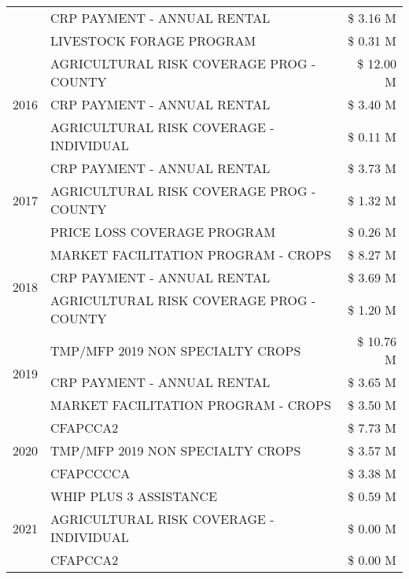 \begin{tabular}{llr}
 & CRP PAYMENT - ANNUAL RENTAL & \$ 3.16 M \\
 & LIVESTOCK FORAGE PROGRAM & \$ 0.31 M \\
\cline{1-3}
\multirow[t]{3}{*}{2016} & AGRICULTURAL RISK COVERAGE PROG - COUNTY & \$ 12.00 M \\
 & CRP PAYMENT - ANNUAL RENTAL & \$ 3.40 M \\
 & AGRICULTURAL RISK COVERAGE - INDIVIDUAL & \$ 0.11 M \\
\cline{1-3}
\multirow[t]{3}{*}{2017} & CRP PAYMENT - ANNUAL RENTAL & \$ 3.73 M \\
 & AGRICULTURAL RISK COVERAGE PROG - COUNTY & \$ 1.32 M \\
 & PRICE LOSS COVERAGE PROGRAM & \$ 0.26 M \\
\cline{1-3}
\multirow[t]{3}{*}{2018} & MARKET FACILITATION PROGRAM - CROPS & \$ 8.27 M \\
 & CRP PAYMENT - ANNUAL RENTAL & \$ 3.69 M \\
 & AGRICULTURAL RISK COVERAGE PROG - COUNTY & \$ 1.20 M \\
\cline{1-3}
\multirow[t]{3}{*}{2019} & TMP/MFP 2019 NON SPECIALTY CROPS & \$ 10.76 M \\
 & CRP PAYMENT - ANNUAL RENTAL & \$ 3.65 M \\
 & MARKET FACILITATION PROGRAM - CROPS & \$ 3.50 M \\
\cline{1-3}
\multirow[t]{3}{*}{2020} & CFAPCCA2 & \$ 7.73 M \\
 & TMP/MFP 2019 NON SPECIALTY CROPS & \$ 3.57 M \\
 & CFAPCCCCA & \$ 3.38 M \\
\cline{1-3}
\multirow[t]{3}{*}{2021} & WHIP PLUS 3 ASSISTANCE & \$ 0.59 M \\
 & AGRICULTURAL RISK COVERAGE - INDIVIDUAL & \$ 0.00 M \\
 & CFAPCCA2 & \$ 0.00 M \\
\cline{1-3}
\bottomrule
\end{tabular}
